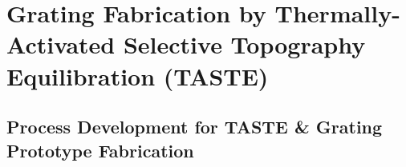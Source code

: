 \documentclass[aspectratio=169,9pt]{beamer}
\begin{document}


\section{Grating Fabrication by Thermally-Activated Selective Topography Equilibration (TASTE)} 
\subsection{Process Development for TASTE \& Grating Prototype Fabrication}
\end{document}
